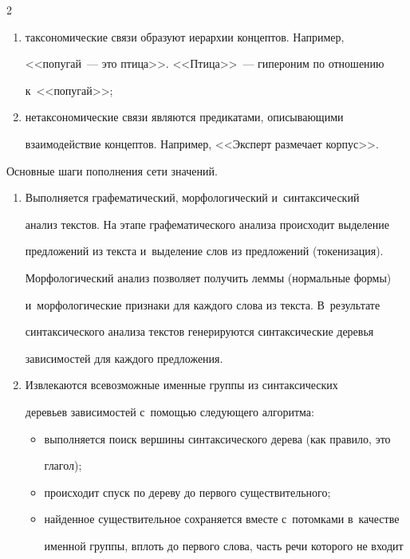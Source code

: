 \begin{multicols}{2}
\begin{enumerate}[(1)]
\item таксономические связи образуют иерархии концептов. Например, 


<<попугай~--- это птица>>. <<Птица>>~--- гипероним по отношению 


к~<<попугай>>;


\item нетаксономические связи являются предикатами, описывающими 


взаимодействие концептов. Например, <<Эксперт размечает корпус>>.


\end{enumerate}





  Основные шаги пополнения сети значений.


  \begin{enumerate}[1.]


\item  Выполняется графематический, морфологический и~синтаксический 


анализ текстов. На этапе графематического анализа происходит выделение 


предложений из текста и~выделение слов из предложений (токенизация). 


Морфологический анализ позволяет получить леммы (нормальные формы) 


и~морфологические признаки для каждого слова из текста. В~результате 


синтаксического анализа текстов генерируются синтаксические деревья 


зависимостей для каждого предложения. 


  \item Извлекаются всевозможные именные группы из синтаксических 


деревьев зависимостей с~помощью следующего алгоритма:


  \begin{itemize}


\item выполняется поиск вершины синтаксического дерева (как правило, это 


глагол);


\item происходит спуск по дереву до первого существительного;


\item найденное существительное сохраняется вместе с~потомками в~качестве 


именной группы, вплоть до первого слова, часть речи которого не входит 



\end{itemize}
\end{enumerate}
\end{multicols}
